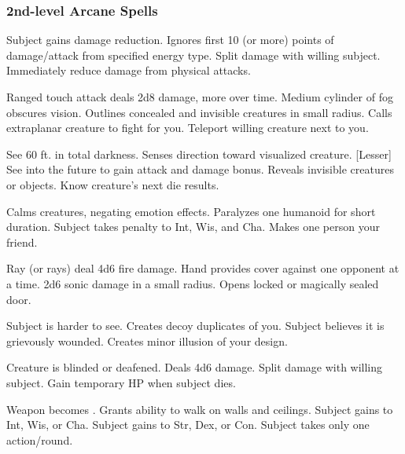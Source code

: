 \subsubsection{2nd-level Arcane Spells} 
\begin{swspelllist}
     Subject gains damage reduction.
     Ignores first 10 (or more) points of damage/attack from specified energy type.
     Split damage with willing subject.
     Immediately reduce damage from physical attacks.

     Ranged touch attack deals 2d8 damage, more over time.
     Medium cylinder of fog obscures vision.
     Outlines concealed and invisible creatures in small radius.
     Calls extraplanar creature to fight for you.
     Teleport willing creature next to you.

     See 60 ft. in total darkness.
     Senses direction toward visualized creature.
    [Lesser] See into the future to gain attack and damage bonus.
     Reveals invisible creatures or objects.
     Know creature's next die results.

     Calms creatures, negating emotion effects.
     Paralyzes one humanoid for short duration.
     Subject takes  penalty to Int, Wis, and Cha.
     Makes one person your friend.

     Ray (or rays) deal 4d6 fire damage.
     Hand provides cover against one opponent at a time.
     2d6 sonic damage in a small radius.
     Opens locked or magically sealed door.

     Subject is harder to see.
     Creates decoy duplicates of you.
     Subject believes it is grievously wounded.
     Creates minor illusion of your design.

     Creature is blinded or deafened.
     Deals 4d6 damage.
     Split damage with willing subject.
     Gain temporary HP when subject dies.

     Weapon becomes .
     Grants ability to walk on walls and ceilings.
     Subject gains  to Int, Wis, or Cha.
     Subject gains  to Str, Dex, or Con.
     Subject takes only one action/round.
\end{swspelllist}

